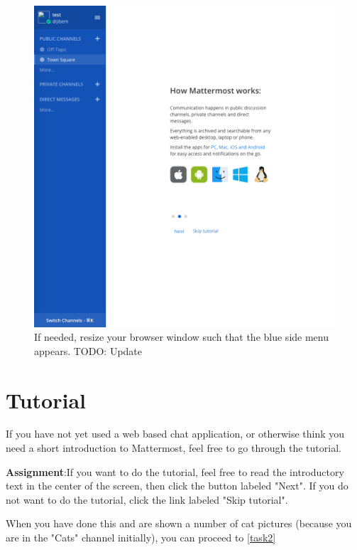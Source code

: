 \documentclass[paper=a4, fontsize=11pt]{scrartcl} %
\numberwithin{equation}{section} %
\numberwithin{figure}{section} %
\numberwithin{table}{section} %
\begin{document}
\begin{figure}[htb]
        \includegraphics[width=\textwidth]{menu-example}
        \caption{If needed, resize your browser window such that the blue side menu appears. TODO: Update}
        \label{menu-example}
\end{figure}



\section{Tutorial}
\label{task1}

If you have not yet used a web based chat application, or otherwise think you need a short introduction to Mattermost, feel free to go through the tutorial.

\textbf{Assignment}:If you want to do the tutorial, feel free to read the introductory text in the center of the screen, then click the button labeled "Next".
If you do not want to do the tutorial, click the link labeled "Skip tutorial".

When you have done this and are shown a number of cat pictures (because you are in the "Cats" channel initially), you can proceed to \ref{task2}
\end{document}
